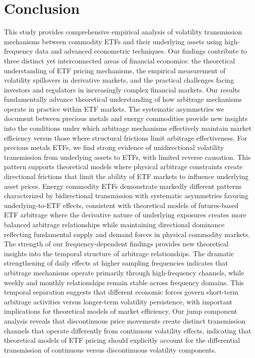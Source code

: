 
\section{Conclusion} \label{sec}
This study provides comprehensive empirical analysis of volatility transmission mechanisms between commodity ETFs and their underlying assets using high-frequency data and advanced econometric techniques. Our findings contribute to three distinct yet interconnected areas of financial economics: the theoretical understanding of ETF pricing mechanisms, the empirical measurement of volatility spillovers in derivative markets, and the practical challenges facing investors and regulators in increasingly complex financial markets.
Our results fundamentally advance theoretical understanding of how arbitrage mechanisms operate in practice within ETF markets. The systematic asymmetries we document between precious metals and energy commodities provide new insights into the conditions under which arbitrage mechanisms effectively maintain market efficiency versus those where structural frictions limit arbitrage effectiveness. For precious metals ETFs, we find strong evidence of unidirectional volatility transmission from underlying assets to ETFs, with limited reverse causation. This pattern supports theoretical models where physical arbitrage constraints create directional frictions that limit the ability of ETF markets to influence underlying asset prices. Energy commodity ETFs demonstrate markedly different patterns characterized by bidirectional transmission with systematic asymmetries favoring underlying-to-ETF effects, consistent with theoretical models of futures-based ETF arbitrage where the derivative nature of underlying exposures creates more balanced arbitrage relationships while maintaining directional dominance reflecting fundamental supply and demand forces in physical commodity markets.
The strength of our frequency-dependent findings provides new theoretical insights into the temporal structure of arbitrage relationships. The dramatic strengthening of daily effects at higher sampling frequencies indicates that arbitrage mechanisms operate primarily through high-frequency channels, while weekly and monthly relationships remain stable across frequency domains. This temporal separation suggests that different economic forces govern short-term arbitrage activities versus longer-term volatility persistence, with important implications for theoretical models of market efficiency. Our jump component analysis reveals that discontinuous price movements create distinct transmission channels that operate differently from continuous volatility effects, indicating that theoretical models of ETF pricing should explicitly account for the differential transmission of continuous versus discontinuous volatility components.
